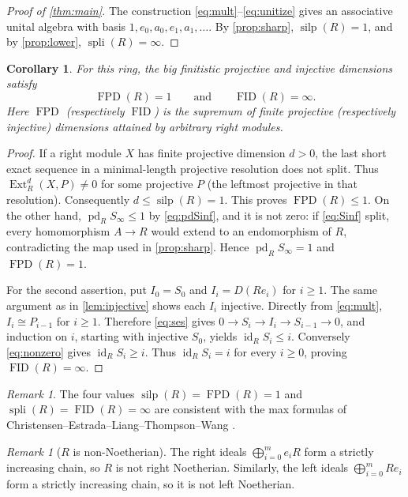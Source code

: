 \documentclass[11pt]{amsart}
\newtheorem{corollary}[theorem]{Corollary}
\theoremstyle{definition}
\theoremstyle{remark}
\newtheorem{remark}[theorem]{Remark}
\newcommand{\silp}{\operatorname{silp}}
\newcommand{\spli}{\operatorname{spli}}
\newcommand{\pd}{\operatorname{pd}}
\newcommand{\idim}{\operatorname{id}}
\newcommand{\FPD}{\operatorname{FPD}}
\newcommand{\FID}{\operatorname{FID}}
\newcommand{\Ext}{\operatorname{Ext}}
\begin{document}
\begin{proof}[Proof of \cref{thm:main}]
The construction \eqref{eq:mult}--\eqref{eq:unitize} gives an associative unital algebra with basis $1,e_0,a_0,e_1,a_1,\ldots$. By \cref{prop:sharp}, $\silp(R)=1$, and by \cref{prop:lower}, $\spli(R)=\infty$.
\end{proof}

\begin{corollary}\label{cor:fid}
For this ring, the big finitistic projective and injective dimensions satisfy
\[
\FPD(R)=1\qquad\text{and}\qquad\FID(R)=\infty.
\]
Here $\FPD$ (respectively $\FID$) is the supremum of finite projective (respectively injective) dimensions attained by arbitrary right modules.
\end{corollary}
\begin{proof}
If a right module $X$ has finite projective dimension $d>0$, the last short exact sequence in a minimal-length projective resolution does not split. Thus $\Ext_R^d(X,P)\ne0$ for some projective $P$ (the leftmost projective in that resolution). Consequently $d\leq\silp(R)=1$. This proves $\FPD(R)\leq1$. On the other hand, $\pd_R S_\infty\leq1$ by \eqref{eq:pdSinf}, and it is not zero: if \eqref{eq:Sinf} split, every homomorphism $A\to R$ would extend to an endomorphism of $R$, contradicting the map used in \cref{prop:sharp}. Hence $\pd_R S_\infty=1$ and $\FPD(R)=1$.

For the second assertion, put $I_0=S_0$ and $I_i=D(Re_i)$ for $i\geq1$. The same argument as in \cref{lem:injective} shows each $I_i$ injective. Directly from \eqref{eq:mult}, $I_i\cong P_{i-1}$ for $i\geq1$. Therefore \eqref{eq:ses} gives $0\to S_i\to I_i\to S_{i-1}\to0$, and induction on $i$, starting with injective $S_0$, yields $\idim_R S_i\leq i$. Conversely \eqref{eq:nonzero} gives $\idim_R S_i\geq i$. Thus $\idim_R S_i=i$ for every $i\geq0$, proving $\FID(R)=\infty$.
\end{proof}

\begin{remark}
The four values $\silp(R)=\FPD(R)=1$ and $\spli(R)=\FID(R)=\infty$ are consistent with the max formulas of Christensen--Estrada--Liang--Thompson--Wang \cite[Theorem~1.18]{CELTW2024}.
\end{remark}

\begin{remark}[$R$ is non-Noetherian]
The right ideals $\bigoplus_{i=0}^m e_iR$ form a strictly increasing chain, so $R$ is not right Noetherian. Similarly, the left ideals $\bigoplus_{i=0}^m Re_i$ form a strictly increasing chain, so it is not left Noetherian.
\end{remark}
\end{document}
